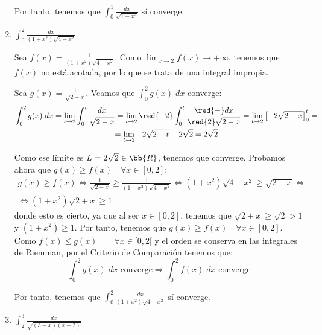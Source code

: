 \begin{ejercicio}
\begin{enumerate}
    Por tanto, tenemos que  $\displaystyle \int_0^1 \frac{dx}{\sqrt{1-x^4}}$ sí converge.


    \item $\displaystyle \int_0^2 \frac{dx}{(1+x^2)\sqrt{4-x^2}}$

    Sea $\displaystyle f(x)=\frac{1}{(1+x^2)\sqrt{4-x^2}}$. Como $\displaystyle \lim_{x\to 2}f(x)\to +\infty$, tenemos que $f(x)$ no está acotada, por lo que se trata de una integral impropia.

    Sea $g(x)=\frac{1}{\sqrt{2-x}}$. Veamos que $\int_0^2 g(x)\;dx$ converge:
    \begin{multline*}
        \int_0^2 g(x)\;dx
        = \lim_{t\to 2} \int_0^t \frac{dx}{\sqrt{2-x}}
        = \lim_{t\to 2} \red{-2}\int_0^t \frac{\red{-}dx}{\red{2}\sqrt{2-x}}
        = \lim_{t\to 2} \left[-2\sqrt{2-x}\right]_0^t 
        =\\=
        \lim_{t\to 2} -2\sqrt{2-t} +2\sqrt{2} = 2\sqrt{2}
    \end{multline*}

    Como ese límite es $L=2\sqrt{2}\in \bb{R}$, tenemos que converge. Probamos ahora que $g(x)\geq f(x) \quad \forall x\in [0,2]$:
    \begin{multline*}
        g(x)\geq f(x) \Longleftrightarrow \frac{1}{\sqrt{2-x}} \geq \frac{1}{(1+x^2)\sqrt{4-x^2}}
        \Longleftrightarrow {(1+x^2)\sqrt{4-x^2}} \geq \sqrt{2-x} \Longleftrightarrow \\ \Longleftrightarrow
        {(1+x^2)\sqrt{2+x}} \geq 1
    \end{multline*}
    donde esto es cierto, ya que al ser $x\in [0,2]$, tenemos que $\sqrt{2+x}\geq \sqrt{2}>1$ y $(1+x^2)\geq 1$. Por tanto, tenemos que $g(x)\geq f(x)\quad \forall x\in [0,2]$.\\

    Como $f(x)\leq g(x) \qquad \forall x\in [0,2[$ y el orden se conserva en las integrales de Riemman, por el Criterio de Comparación tenemos que:
    \begin{equation*}
        \int_0^2 g(x)\;dx \text{ converge} \Longrightarrow 
        \int_0^2 f(x)\;dx \text{ converge}
    \end{equation*}

    Por tanto, tenemos que  $\displaystyle \int_0^2 \frac{dx}{(1+x^2)\sqrt{4-x^2}}$ sí converge.




    \item $\displaystyle \int_2^3 \frac{dx}{\sqrt{(3-x)(x-2)}}$


\end{enumerate}
\end{ejercicio}
